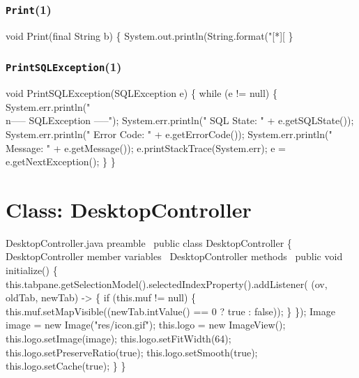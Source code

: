 \subsection{\texttt{Print}(1)}
\nwenddocs{}\endmoddef{}
void Print(final String b) \{
  System.out.println(String.format("[*][%
\}
\nwendcode{}\nwdocspar

\subsection{\texttt{PrintSQLException}(1)}
\nwenddocs{}\endmoddef{}
void PrintSQLException(SQLException e) \{
  while (e != null) \{
    System.err.println("\\n----- SQLException -----");
    System.err.println("  SQL State:  " + e.getSQLState());
    System.err.println("  Error Code: " + e.getErrorCode());
    System.err.println("  Message:    " + e.getMessage());
    e.printStackTrace(System.err);
    e = e.getNextException();
  \}
\}
\eatline
{}\nwendcode{}\nwdocspar
\nwenddocs{}\chapter{Class: DesktopController}
\label{deskcon}

\nwenddocs{}\endmoddef{}
\LA{}DesktopController.java preamble~{\nwtagstyle{}}\RA{}
public class DesktopController \{
  \LA{}\code{}DesktopController\edoc{} member variables~{\nwtagstyle{}}\RA{}
  \LA{}\code{}DesktopController\edoc{} methods~{\nwtagstyle{}}\RA{}
  public void initialize() \{
    this.tabpane.getSelectionModel().selectedIndexProperty().addListener(
        (ov, oldTab, newTab) -> \{
      if (this.muf != null) \{
        this.muf.setMapVisible((newTab.intValue() == 0 ? true : false));
      \}
    \});
    Image image = new Image("res/icon.gif");
    this.logo = new ImageView();
    this.logo.setImage(image);
    this.logo.setFitWidth(64);
    this.logo.setPreserveRatio(true);
    this.logo.setSmooth(true);
    this.logo.setCache(true);
  \}
\}
\nwendcode{}\nwdocspar

